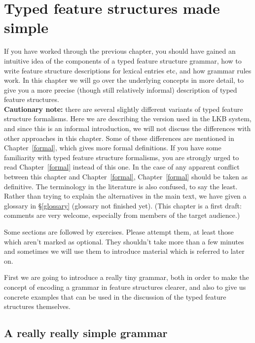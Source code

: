 \documentclass[12pt]{report}
\begin{document}
\chapter{Typed feature structures made simple}
\label{easy}


If you have worked through the previous chapter, you should have
gained an intuitive idea of the components of a typed feature structure
grammar, how to write feature structure descriptions for lexical entries
etc, and how grammar rules work.  In this chapter we will go over the
underlying concepts in more detail, to give you a more precise (though 
still relatively informal)
description of typed feature structures.\\
{\bf 
Cautionary note:}  there are several slightly different variants of
typed feature structure formalisms.  Here we are describing the 
version used in the LKB system, and since this is an informal
introduction, we will not discuss the differences with other approaches
in this chapter.  Some of these differences are mentioned in Chapter~\ref{formal},
which gives more formal definitions.  If you have some familiarity
with typed feature structure formalisms, you are strongly urged to 
read Chapter~\ref{formal} instead of this one.  In the case
of any apparent conflict between this chapter and Chapter~\ref{formal},
Chapter~\ref{formal} should be taken as definitive.  
The terminology in the literature is also confused, to say the least.  
Rather than trying to explain the alternatives in the main
text, we have given a glossary in \S\ref{glossary} (glossary
not finished yet).
(This chapter is a first draft: comments are very welcome, especially
from members of the target audience.)

Some sections are followed by
exercises.  Please attempt them, at least those which aren't marked as 
optional.  They shouldn't take more than a few minutes 
and sometimes we will use them to introduce material which is 
referred to later on.

First we are going to introduce a really tiny grammar, both in order
to make the concept of encoding a grammar in feature structures clearer,
and also to give us concrete examples that can be used in the discussion
of the typed feature structures themselves.  


\section{A really really simple grammar}
\end{document}
